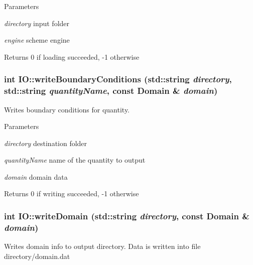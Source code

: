 \begin{DoxyParams}{Parameters}
\item[{\em directory}]input folder \item[{\em engine}]scheme engine\end{DoxyParams}
\begin{DoxyReturn}{Returns}
0 if loading succeeded, -\/1 otherwise 
\end{DoxyReturn}
\hypertarget{namespaceIO_a07f46c0c99961c52b5f6410a84d58a64}{
\subsubsection[{writeBoundaryConditions}]{\setlength{\rightskip}{0pt plus 5cm}int IO::writeBoundaryConditions (std::string {\em directory}, \/  std::string {\em quantityName}, \/  const {\bf Domain} \& {\em domain})}}
\label{namespaceIO_a07f46c0c99961c52b5f6410a84d58a64}


Writes boundary conditions for quantity. 
\begin{DoxyParams}{Parameters}
\item[{\em directory}]destination folder \item[{\em quantityName}]name of the quantity to output \item[{\em domain}]domain data\end{DoxyParams}
\begin{DoxyReturn}{Returns}
0 if writing succeeded, -\/1 otherwise 
\end{DoxyReturn}
\hypertarget{namespaceIO_a63332902621fd10f3117978585af8a27}{
\subsubsection[{writeDomain}]{\setlength{\rightskip}{0pt plus 5cm}int IO::writeDomain (std::string {\em directory}, \/  const {\bf Domain} \& {\em domain})}}
\label{namespaceIO_a63332902621fd10f3117978585af8a27}


Writes domain info to output directory. Data is written into file directory/domain.dat


